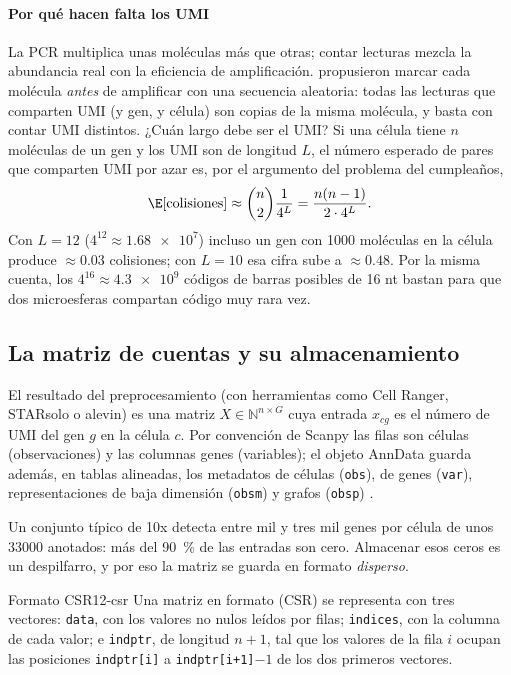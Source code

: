 \paragraph{Por qué hacen falta los UMI} La PCR multiplica unas moléculas más que otras; contar lecturas mezcla la abundancia real con la eficiencia de amplificación. \textcite{c12-kivioja2012} propusieron marcar cada molécula \emph{antes} de amplificar con una secuencia aleatoria: todas las lecturas que comparten UMI (y gen, y célula) son copias de la misma molécula, y basta con contar UMI distintos. ¿Cuán largo debe ser el UMI? Si una célula tiene $n$ moléculas de un gen y los UMI son de longitud $L$, el número esperado de pares que comparten UMI por azar es, por el argumento del problema del cumpleaños,
\begin{equation}\label{eq:12-colision}
\E[\text{colisiones}] \approx \binom{n}{2}\frac{1}{4^{L}} = \frac{n(n-1)}{2\cdot 4^{L}}.
\end{equation}
Con $L=12$ ($4^{12}\approx\num{1.68e7}$) incluso un gen con \num{1000} moléculas en la célula produce $\approx\num{0.03}$ colisiones; con $L=10$ esa cifra sube a $\approx\num{0.48}$. Por la misma cuenta, los $4^{16}\approx\num{4.3e9}$ códigos de barras posibles de 16 nt bastan para que dos microesferas compartan código muy rara vez.

\subsection{La matriz de cuentas y su almacenamiento}

El resultado del preprocesamiento (con herramientas como Cell Ranger, STARsolo o alevin) es una matriz $X\in\mathbb{N}^{n\times G}$ cuya entrada $x_{cg}$ es el número de UMI del gen $g$ en la célula $c$. Por convención de Scanpy las filas son células (observaciones) y las columnas genes (variables); el objeto AnnData guarda además, en tablas alineadas, los metadatos de células (\texttt{obs}), de genes (\texttt{var}), representaciones de baja dimensión (\texttt{obsm}) y grafos (\texttt{obsp}) \parencite{c12-wolf2018}.

Un conjunto típico de 10x detecta entre mil y tres mil genes por célula de unos \num{33000} anotados: más del \SI{90}{\percent} de las entradas son cero. Almacenar esos ceros es un despilfarro, y por eso la matriz se guarda en formato \emph{disperso}.

\begin{definicion}{Formato CSR}{12-csr}
Una matriz en formato  (CSR) se representa con tres vectores: \texttt{data}, con los valores no nulos leídos por filas; \texttt{indices}, con la columna de cada valor; e \texttt{indptr}, de longitud $n+1$, tal que los valores de la fila $i$ ocupan las posiciones \texttt{indptr[i]} a \texttt{indptr[i+1]}$-1$ de los dos primeros vectores.
\end{definicion}

